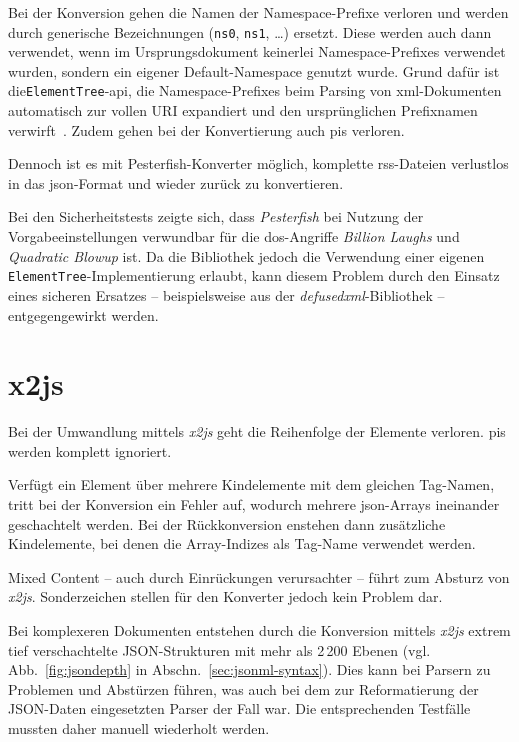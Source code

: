 Bei der Konversion gehen die Namen der Namespace-Prefixe verloren und werden durch generische Bezeichnungen (\texttt{ns0}, \texttt{ns1}, \dots{}) ersetzt. Diese werden auch dann verwendet, wenn im Ursprungsdokument keinerlei Namespace-Prefixes verwendet wurden, sondern ein eigener Default-Namespace genutzt wurde. Grund dafür ist die\linebreak{}\texttt{ElementTree}-\acrshort{api}, die Namespace-Prefixes beim Parsing von \acrshort{xml}-Dokumenten automatisch zur vollen URI expandiert und den ursprünglichen Prefixnamen verwirft~\cite[Abschn.~20.5.1.7]{pythonetreexmlns}.
Zudem gehen bei der Konvertierung auch \glspl{pi} verloren.

Dennoch ist es mit Pesterfish-Konverter möglich, komplette \acrshort{rss}-Dateien verlustlos in das \acrshort{json}-Format und wieder zurück zu konvertieren.

Bei den Sicherheitstests zeigte sich, dass \emph{Pesterfish} bei Nutzung der Vorgabeeinstellungen verwundbar für die \acrshort{dos}-Angriffe \emph{Billion Laughs} und \emph{Quadratic Blowup} ist. Da die Bibliothek jedoch die Verwendung einer eigenen \texttt{ElementTree}-Implementierung erlaubt, kann diesem Problem durch den Einsatz eines sicheren Ersatzes -- beispielsweise aus der \emph{defusedxml}-Bibliothek -- entgegengewirkt werden.

\section{x2js}
\label{sec:x2js}

Bei der Umwandlung mittels \emph{x2js} geht die Reihenfolge der Elemente verloren. \glspl{pi} werden komplett ignoriert.

Verfügt ein Element über mehrere Kindelemente mit dem gleichen Tag-Namen, tritt bei der Konversion ein Fehler auf, wodurch mehrere \acrshort{json}-Arrays ineinander geschachtelt werden. Bei der Rückkonversion enstehen dann zusätzliche Kindelemente, bei denen die Array-Indizes als Tag-Name verwendet werden.

Mixed Content -- auch durch Einrückungen verursachter -- führt zum Absturz von \emph{x2js}. Sonderzeichen stellen für den Konverter jedoch kein Problem dar.

Bei komplexeren Dokumenten entstehen durch die Konversion mittels \emph{x2js} extrem tief verschachtelte JSON-Strukturen mit mehr als 2\,200 Ebenen (vgl. Abb.~\ref{fig:jsondepth} in Abschn.~\ref{sec:jsonml-syntax}). Dies kann bei Parsern zu Problemen und Abstürzen führen, was auch bei dem zur Reformatierung der JSON-Daten eingesetzten Parser der Fall war. Die entsprechenden Testfälle mussten daher manuell wiederholt werden.

